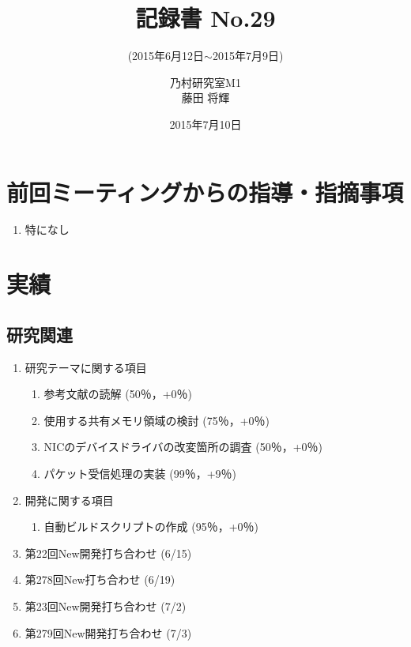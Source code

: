 \documentclass[fleqn, 14pt]{extarticle}
\subtitle{(2015年6月12日$\sim$2015年7月9日)}
\author{乃村研究室M1\\藤田 将輝}
\date{2015年7月10日}
\title{記録書 No.29}
\begin{document}
\maketitle
\section{前回ミーティングからの指導・指摘事項}
\label{sec-1}
\begin{enumerate}
\item 特になし
\newline
\hfill

\end{enumerate}

\section{実績}
\label{sec-2}

\subsection{研究関連}
\label{sec-2-1}
\begin{enumerate}
    \item 研究テーマに関する項目
    \hfill
    \label{enum-research1}
    \begin{enumerate}

        \item 参考文献の読解
        \hfill
        \label{enum-1-A}
        (50％，+0％)
        \item 使用する共有メモリ領域の検討
        \hfill
        \label{enum-1-B}
        (75％，+0％)
        \item NICのデバイスドライバの改変箇所の調査
        \hfill
        \label{enum-1-C}
        (50％，+0％)
        \item パケット受信処理の実装
        \hfill
        \label{enum-1-D}
        (99％，+9％)

    \end{enumerate}
    \item 開発に関する項目
    \hfill
    \label{enum-research2}
    \begin{enumerate}

        \item 自動ビルドスクリプトの作成
        \hfill
        \label{enum-2-A}
        (95％，+0％)
    \end{enumerate}

    \item 第22回New開発打ち合わせ
    \hfill
    \label{enum-research3}
    (6/15)
    \item 第278回New打ち合わせ 
    \hfill
    \label{enum-research3}
    (6/19)
    \item 第23回New開発打ち合わせ 
    \hfill
    \label{enum-research3}
    (7/2)
    \item 第279回New開発打ち合わせ
    \hfill
    \label{enum-research3}
    (7/3)
    \end{enumerate}
\end{document}

